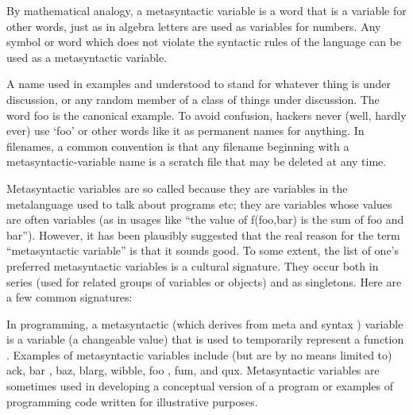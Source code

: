 \documentclass[proposal.tex]{subfiles}
\begin{document}
By mathematical analogy, a metasyntactic variable is a word that is a variable for other words, just as in algebra
letters are used as variables for numbers.
Any symbol or word which does not violate the syntactic rules of the language can be used as a metasyntactic
variable.




\cite{webiste:metasyntacticvariablescatb}
A name used in examples and understood to stand for whatever thing is under discussion, or any random member of a class of things under discussion. The word foo is the canonical example. To avoid confusion, hackers never (well, hardly ever) use `foo'
or other words like it as permanent names for anything. In filenames, a common convention is that any filename beginning with a metasyntactic-variable name is a scratch file that may be deleted at any time.

Metasyntactic variables are so called because they are variables in the metalanguage used to talk about programs
etc; they are variables whose values are often variables (as in usages like ``the value of f(foo,bar) is
the sum of foo and bar'').
However, it has been plausibly suggested that the real reason for the term ``metasyntactic
variable'' is that it sounds good.
To some extent, the list of one's preferred metasyntactic variables is a cultural signature.
They occur both in series (used for related groups of variables or objects) and as singletons.
Here are a few common signatures:


\cite{webiste:metasyntacticvariableswhatistectarget}
In programming, a metasyntactic (which derives from meta and syntax ) variable is a variable (a changeable value) that is used to temporarily represent a function . Examples of metasyntactic variables include (but are by no means limited to) ack, bar , baz, blarg, wibble, foo , fum, and qux. Metasyntactic variables are sometimes used in developing a conceptual version of a program or examples of programming code written for illustrative purposes.
\end{document}
